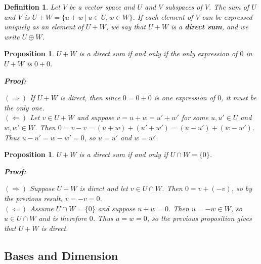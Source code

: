 \documentclass{article}
\theoremstyle{colontheorem}
\newtheorem{proposition}[theorem]{Proposition}
\newtheorem{definition}[theorem]{Definition}
\newenvironment{Proposition}
{
	\begin{mdframed}[backgroundcolor=TheoremOrange!10]
	\begin{proposition}
}
{
	\end{proposition}
	\end{mdframed}
	
	\vspace{.15in}
}
\newenvironment{Def}
{
	\begin{mdframed}[backgroundcolor=DefGreen!10]
	\begin{definition}
}
{
	\end{definition}
	\end{mdframed}
	
	\vspace{.15in}
}
\newenvironment{Proof}
{
	\begin{mdframed}[backgroundcolor=ProofPurple!10]
	\textbf{Proof:}%
}
{
	\end{mdframed}
	
	\vspace{.085in}
}
\begin{document}
\begin{Def}
	
	Let $V$ be a vector space and $U$ and $V$ subspaces of $V$. The sum of $U$ and $V$ is $U+W = \{u+w\ |\ u \in U, w \in W\}$. If each element of $V$ can be expressed uniquely as an element of $U+W$, we say that $U+W$ is a \textbf{direct sum}, and we write $U \oplus W$.
	
\end{Def}



\begin{Proposition}
	
	$U+W$ is a direct sum if and only if the only expression of $0$ in $U+W$ is $0+0$.
	
	\begin{Proof}
		$(\Rightarrow)$ If $U+W$ is direct, then since $0 = 0+0$ is one expression of $0$, it must be the only one.\\
		
		$(\Leftarrow)$ Let $v \in U+W$ and suppose $v = u + w = u' + w'$ for some $u, u' \in U$ and $w, w' \in W$. Then $0 = v - v = (u+w) + (u'+w') = (u-u') + (w-w')$. Thus $u-u' = w-w' = 0$, so $u = u'$ and $w = w'$. 
		
	\end{Proof}
	
\end{Proposition}



\begin{Proposition}
	
	$U+W$ is a direct sum if and only if $U \cap W = \{0\}$.
	
	\begin{Proof}
		$(\Rightarrow)$ Suppose $U+W$ is direct and let $v \in U \cap W$. Then $0 = v + (-v)$, so by the previous result, $v = -v = 0$.\\
		
		$(\Leftarrow)$ Assume $U \cap W = \{0\}$ and suppose $u + w = 0$. Then $u = -w \in W$, so $u \in U \cap W$ and is therefore $0$. Thus $u = w = 0$, so the previous proposition gives that $U + W$ is direct.
		
	\end{Proof}
	
\end{Proposition}





\begin{center}
	\pagebreak
	
	\section{Bases and Dimension}
	
	\vspace{.1in}
\end{center}
\end{document}
